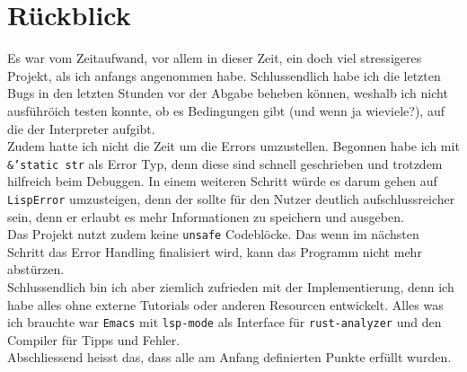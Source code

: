 \documentclass[11pt]{article}
\begin{document}
\section{Rückblick}
\label{sec:org5853dc5}
\noindent
Es war vom Zeitaufwand, vor allem in dieser Zeit, ein doch viel
stressigeres Projekt, als ich anfangs angenommen habe. Schlussendlich
habe ich die letzten Bugs in den letzten Stunden vor der Abgabe
beheben können, weshalb ich nicht ausführöich testen konnte, ob es
Bedingungen gibt (und wenn ja wieviele?), auf die der Interpreter
aufgibt.\\

\noindent
Zudem hatte ich nicht die Zeit um die Errors umzustellen. Begonnen
habe ich mit \texttt{\&'static str} als Error Typ, denn diese sind schnell
geschrieben und trotzdem hilfreich beim Debuggen. In einem weiteren
Schritt würde es darum gehen auf \texttt{LispError} umzusteigen, denn der
sollte für den Nutzer deutlich aufschlussreicher sein, denn er erlaubt
es mehr Informationen zu speichern und ausgeben.\\

\noindent
Das Projekt nutzt zudem keine \texttt{unsafe} Codeblöcke. Das wenn im nächsten
Schritt das Error Handling finalisiert wird, kann das Programm nicht
mehr abstürzen.\\

\noindent
Schlussendlich bin ich aber ziemlich zufrieden mit der
Implementierung, denn ich habe alles ohne externe Tutorials oder
anderen Resourcen entwickelt. Alles was ich brauchte war \texttt{Emacs} mit
\texttt{lsp-mode} als Interface für \texttt{rust-analyzer} und den Compiler für Tipps
und Fehler.\\

\noindent
Abschliessend heisst das, dass alle am Anfang definierten Punkte
erfüllt wurden.\\
\end{document}
